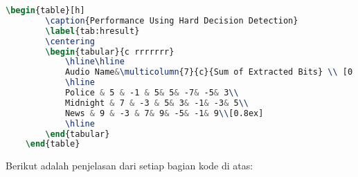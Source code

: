 \begin{lstlisting}[language=TeX, caption=Kode untuk Membuat Tabel dalam Dokumen, label=lst:kode_tabel]
    \begin{table}[h]
        \caption{Performance Using Hard Decision Detection}
        \label{tab:hresult}
        \centering
        \begin{tabular}{c rrrrrrr}
            \hline\hline
            Audio Name&\multicolumn{7}{c}{Sum of Extracted Bits} \\ [0.5ex] 
            \hline
            Police & 5 & -1 & 5& 5& -7& -5& 3\\
            Midnight & 7 & -3 & 5& 3& -1& -3& 5\\
            News & 9 & -3 & 7& 9& -5& -1& 9\\[0.8ex]
            \hline
        \end{tabular}
    \end{table}
\end{lstlisting}

\noindent Berikut adalah penjelasan dari setiap bagian kode di atas:

